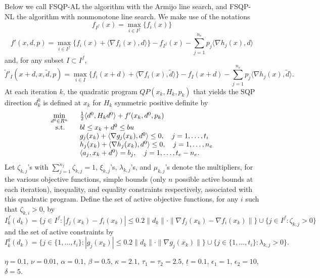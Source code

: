 Below we call FSQP-AL
the algorithm with the Armijo line search, and FSQP-NL the algorithm
with nonmonotone line search. We make use of the notations
$$f_{I^f}(x)=\max\limits _{i\in I^f} \{f_i(x)\}$$
$$f'(x,d,p)=\max\limits_{i\in I^f}\{f_i(x)+
    \langle \nabla f_i(x),d\rangle\} - f_{I^f}(x)
    -\sum\limits_{j=1}^{n_e}p_j\langle\nabla h_j(x),d\rangle$$
and, for any subset $I\subset I^f$,
$$\tilde {f}'_I(x+d,x,\tilde d,p)=\max\limits_{i\in I}\{f_i(x+d)+
    \langle \nabla f_i(x),\tilde d\rangle\} - f_{I}(x+d)
    -\sum\limits_{j=1}^{n_e}p_j\langle\nabla h_j(x),\tilde d\rangle.$$
At each iteration $k$, the quadratic program $QP(x_k,H_k,p_k)$ that yields
the SQP direction $d^0_k$ is defined
at $x_k$ for $H_k$ symmetric positive definite by
\smallskip
$$\begin{array}{ll}
   \min\limits_{d^0\in R^n}~~ &  {1 \over {2}}\langle {d^0},H_k {d^0}
                 \rangle+f'(x_k,d^0,p_k)  \\
  {\rm ~~s.t.} &  bl \leq x_k+d^0 \leq bu \\
              & g_j(x_k)+\langle\nabla g_j(x_k),d^0 \rangle
             \leq 0, ~~~j=1,\ldots , t_i \\
              & h_j(x_k)+\langle\nabla h_j(x_k),d^0 \rangle
             \leq 0, ~~~j=1,\ldots ,n_e \\
              & \langle a_j,x_k + d^0 \rangle=b_j,
             ~~~j=1,\ldots , t_e-n_e. \end{array}$$
Let $\zeta _{k,j}$'s with $\sum_{j=1}^{n_f} \zeta _{k,j} =1$, 
$\xi_{k,j}$'s, $\lambda _{k,j}$'s, and $\mu_{k,j}$'s denote 
the multipliers, for the various objective functions, simple 
bounds (only $n$ possible active bounds at each iteration), inequality,
and equality constraints respectively, associated 
with this quadratic program. 
Define the set of active objective functions, 
for any $i$ such that $\zeta_{k,i}>0$, by
$$
I^f_k(d_k)=\{j\in I^f: |f_j(x_k)-f_i(x_k)|\leq 
0.2\|d_k\|\cdot\|\nabla f_j(x_k)-\nabla f_i(x_k)\|\}
\cup\{j\in I^f:\zeta_{k,j}>0\}
$$
and the set of active constraints by
$$
I^g_k(d_k)\!=\!\{j\!\in\!\{1,\ldots,t_i\}:|g_j(x_k)|\leq
0.2\|d_k\|\cdot\|\nabla g_j(x_k)\|\}
\cup\{j\in\{1,\ldots,t_i\}:\lambda_{k,j}>0\}.
$$

\vspace{1em}

\vspace{1em}
 $\eta =0.1$, $\nu=0.01$, $\alpha=0.1$,
$\beta=0.5$, $\kappa = 2.1$, $\tau _1=\tau _2 = 2.5$, $\underline t=0.1$,
$\epsilon_1=1$, $\epsilon_2=10$, $\delta=5$.


